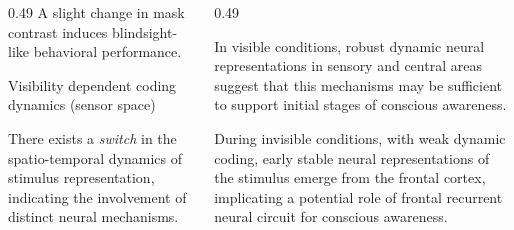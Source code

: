 \documentclass{beamer}
\begin{document}
\begin{frame}
\begin{columns}
\begin{column}{0.49\linewidth}
            A slight change in mask contrast induces blindsight-like behavioral performance.

             \vspace{0.5cm}
            \begin{block}{\LARGE Visibility dependent coding dynamics (sensor space)}
            \centering
            \vspace{1 cm}

\vspace{3 cm}

            \end{block}

        There exists a \emph{switch} in the spatio-temporal dynamics of stimulus representation, indicating the involvement of distinct neural mechanisms.  \\[0.3 cm]





        \end{column}

        \begin{column}{0.49\textwidth}
            \vspace{-0.5 cm}
            \centering

       \vspace{0.5 cm}

        \justifying
        In visible conditions, robust dynamic neural representations in sensory and central areas suggest that this mechanisms may be sufficient to support initial stages of conscious awareness.


        During invisible conditions, with weak dynamic coding, early stable neural representations of the stimulus emerge from the frontal cortex, implicating a potential role of frontal recurrent neural circuit for conscious awareness.


\end{column}
\end{columns}
\end{frame}
\end{document}
